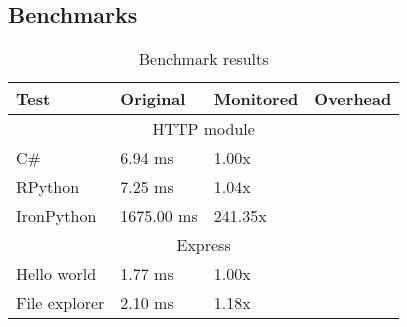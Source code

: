 
\subsection{Benchmarks}

\begin{table}[ht]
  \begin{tabular}{|l|l|l|l|}
    \hline
    \textbf{Test} & 
    \textbf{Original} &
    \textbf{Monitored} &
    \textbf{Overhead} \\
    \hline
    \multicolumn{4}{|c|}{HTTP module}\\
    \hline
    C\# & 
    6.94 ms &
    1.00x &
    \\

    RPython &
    7.25 ms &
    1.04x &
    \\

    IronPython &
    1675.00 ms &
    241.35x &
    \\
    \hline

    \multicolumn{4}{|c|}{Express}\\
    \hline
    Hello world & 
    1.77 ms &
    1.00x &
    \\

    File explorer &
    2.10 ms &
    1.18x &
    \\

    \hline
  \end{tabular}
  \caption{Benchmark results}
  \label{table}
\end{table}
